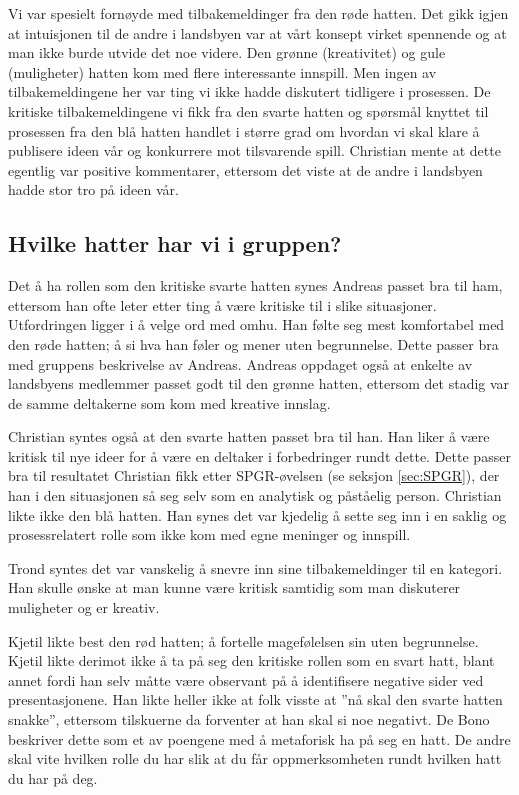 Vi var spesielt fornøyde med tilbakemeldinger fra den røde hatten. Det gikk igjen at intuisjonen til de andre i landsbyen var at vårt konsept virket spennende og at man ikke burde utvide det noe videre. Den grønne (kreativitet) og gule (muligheter) hatten kom med flere interessante innspill. Men ingen av tilbakemeldingene her var ting vi ikke hadde diskutert tidligere i prosessen. De kritiske tilbakemeldingene vi fikk fra den svarte hatten og spørsmål knyttet til prosessen fra den blå hatten handlet i større grad om hvordan vi skal klare å publisere ideen vår og konkurrere mot tilsvarende spill. Christian mente at dette egentlig var positive kommentarer, ettersom det viste at de andre i landsbyen hadde stor tro på ideen vår. 


\subsection{Hvilke hatter har vi i gruppen?}
Det å ha rollen som den kritiske svarte hatten synes Andreas passet bra til ham, ettersom han ofte leter etter ting å være kritiske til i slike situasjoner. Utfordringen ligger i å velge ord med omhu. Han følte seg mest komfortabel med den røde hatten; å si hva han føler og mener uten begrunnelse. Dette passer bra med gruppens beskrivelse av Andreas. Andreas oppdaget også at enkelte av landsbyens medlemmer passet godt til den grønne hatten, ettersom det stadig var de samme deltakerne som kom med kreative innslag.

Christian syntes også at den svarte hatten passet bra til han. Han liker å være kritisk til nye ideer for å være en deltaker i forbedringer rundt dette. Dette passer bra til resultatet Christian fikk etter SPGR-øvelsen (se seksjon \ref{sec:SPGR}), der han i den situasjonen så seg selv som en analytisk og påståelig person. Christian likte ikke den blå hatten. Han synes det var kjedelig å sette seg inn i en saklig og prosessrelatert rolle som ikke kom med egne meninger og innspill.

Trond syntes det var vanskelig å snevre inn sine tilbakemeldinger til en kategori. Han skulle ønske at man kunne være kritisk samtidig som man diskuterer muligheter og er kreativ. 

Kjetil likte best den rød hatten; å fortelle magefølelsen sin uten begrunnelse. Kjetil likte derimot ikke å ta på seg den kritiske rollen som en svart hatt, blant annet fordi han selv måtte være observant på å identifisere negative sider ved presentasjonene. Han likte heller ikke at folk visste at ''nå skal den svarte hatten snakke'', ettersom tilskuerne da forventer at han skal si noe negativt. De Bono beskriver dette som et av poengene med å metaforisk ha på seg en hatt. De andre skal vite hvilken rolle du har slik at du får oppmerksomheten rundt hvilken hatt du har på deg. 

